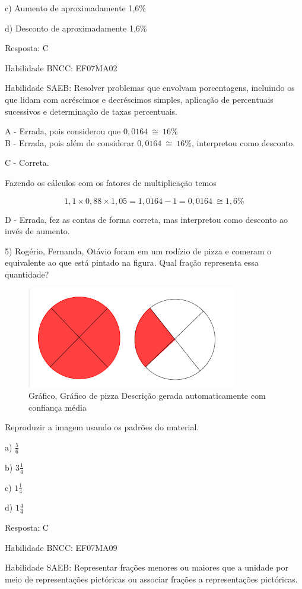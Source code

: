 {{{{{{{{{{{{{{c) Aumento de aproximadamente 1,6\%

d) Desconto de aproximadamente 1,6\%

Resposta: C

Habilidade BNCC: EF07MA02

Habilidade SAEB: Resolver problemas que envolvam porcentagens, incluindo
os que lidam com acréscimos e decréscimos simples, aplicação de
percentuais sucessivos e determinação de taxas percentuais.

A - Errada, pois considerou que \(0,0164\  \cong \ 16\%\)\\
B - Errada, pois além de considerar \(0,0164\  \cong \ 16\%\),
interpretou como desconto.

C - Correta.

Fazendo os cálculos com os fatores de multiplicação temos

\[1,1 \times 0,88 \times 1,05 = 1,0164 - 1 = 0,0164\  \cong 1,6\%\]

D - Errada, fez as contas de forma correta, mas interpretou como
desconto ao invés de aumento.

5) Rogério, Fernanda, Otávio foram em um rodízio de pizza e comeram o
equivalente ao que está pintado na figura. Qual fração representa essa
quantidade?

\begin{figure}
\centering
\includegraphics[width=3.625in,height=1.72917in]{./imgSAEB_7_MAT/media/image95.png}
\caption{Gráfico, Gráfico de pizza Descrição gerada automaticamente com
confiança média}
\end{figure}

Reproduzir a imagem usando os padrões do material.

a) \(\frac{5}{6}\)

b) \(3\frac{1}{4}\)

c) \(1\frac{1}{4}\)

d) \(1\frac{4}{4}\)

Resposta: C

Habilidade BNCC: EF07MA09

Habilidade SAEB: Representar frações menores ou maiores que a unidade
por meio de representações pictóricas ou associar frações a
representações pictóricas.

}}}}}}}}}}}}}}

